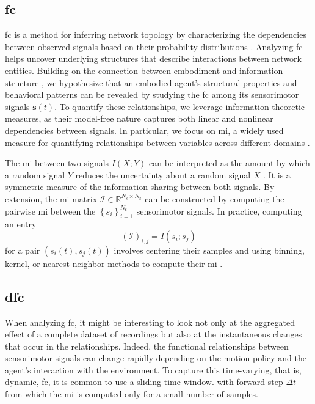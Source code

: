 \documentclass[letterpaper, 10 pt, conference]{ieeeconf}  %
\begin{document}
\subsection{\Acl{fc}}
\ac{fc} is a method for inferring network topology by characterizing the dependencies between observed signals based on their probability distributions \cite{Friston2011FunctionalAE}. Analyzing \ac{fc} helps uncover underlying structures that describe interactions between network entities. Building on the connection between embodiment and information structure%
, we hypothesize that an embodied agent’s structural properties and behavioral patterns 
can be revealed by studying the \ac{fc} among its sensorimotor signals $\bm{s}(t)$. To quantify these relationships, we leverage information-theoretic measures, as their model-free nature captures both linear and nonlinear dependencies between signals. In particular, we focus on \ac{mi}, a widely used measure for quantifying relationships between variables across different domains \cite{Steuer2002mutualinformationdetecting}.

The \ac{mi} between two signals $I\left(X;Y\right)$ can be interpreted as the amount by which a random signal $ Y $ reduces the uncertainty about a random signal $ X $%
. It is a symmetric measure of the information sharing between both signals. By extension, the \ac{mi} matrix $\bm{\mathcal{I}} \in \mathbb{R}^{{N_\text{s}} \times {N_\text{s}}}$ can be constructed by computing the pairwise \ac{mi} between the $\left\lbrace s_i\right\rbrace^{N_\text{s}}_{i=1}$ sensorimotor signals. In practice, computing an entry
\begin{equation}\label{eq:adjacency_mi}
	\left(\bm{\mathcal{I}}\right)_{i,j} = I(s_i;s_j)
\end{equation}
for a pair $\left({s}_i(t),{s}_j(t)\right)$ involves centering their samples and using binning, kernel, or nearest-neighbor methods to compute their \ac{mi} \cite{WaltersWilliams2009Estimationmutualinformation}.

\subsection{\Acl{dfc}}
When analyzing \ac{fc}, it might be interesting to look not only at the aggregated effect of a complete dataset of recordings but also at the instantaneous changes that occur in the relationships. Indeed, the functional relationships between sensorimotor signals can change rapidly depending on the motion policy and the agent's interaction with the environment. To capture this time-varying, that is, dynamic, \acl{fc}, it is common to use a sliding time window. %
with forward step $\Delta t$ from which the \ac{mi} is computed only for a small number of samples.
\end{document}
